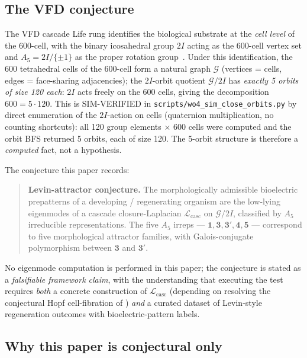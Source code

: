 \documentclass[12pt]{article}
\newcommand{\Lcasc}{\mathcal{L}_{\mathrm{casc}}}
\begin{document}
\subsection{The VFD conjecture}

The VFD cascade Life rung identifies the biological substrate at
the \emph{cell level} of the 600-cell, with the binary
icosahedral group $2I$ acting as the 600-cell vertex set and
$A_5 = 2I/\{\pm 1\}$ as the proper rotation
group~\cite[\S 2.1--2.3, \S 3.1]{CascadeBio}. Under this
identification, the 600 tetrahedral cells of the 600-cell form a
natural graph $\mathcal{G}$ (vertices = cells, edges =
face-sharing adjacencies); the $2I$-orbit quotient
$\mathcal{G}/2I$ has \emph{exactly 5 orbits of size 120 each}:
$2I$ acts freely on the 600 cells, giving the decomposition
$600 = 5 \cdot 120$. This is SIM-VERIFIED in
\texttt{scripts/wo4\_sim\_close\_orbits.py} by direct enumeration
of the $2I$-action on cells (quaternion multiplication, no
counting shortcuts): all 120 group elements × 600 cells were
computed and the orbit BFS returned 5 orbits, each of size 120.
The 5-orbit structure is therefore a \emph{computed} fact, not
a hypothesis.

The conjecture this paper records:

\begin{quote}
\textbf{Levin-attractor conjecture.} The morphologically
admissible bioelectric prepatterns of a developing / regenerating
organism are the low-lying eigenmodes of a cascade
closure-Laplacian $\Lcasc$ on $\mathcal{G}/2I$, classified by
$A_5$ irreducible representations. The five $A_5$ irreps ---
$\mathbf{1}, \mathbf{3}, \mathbf{3}', \mathbf{4}, \mathbf{5}$ ---
correspond to five morphological attractor families, with
Galois-conjugate polymorphism between $\mathbf{3}$ and
$\mathbf{3}'$.
\end{quote}

No eigenmode computation is performed in this paper; the
conjecture is stated as a \emph{falsifiable framework claim},
with the understanding that executing the test requires
\emph{both} a concrete construction of $\Lcasc$ (depending on
resolving the conjectural Hopf cell-fibration of
\cite[\S 2.6, \S 3.2]{CascadeBio}) \emph{and} a curated dataset
of Levin-style regeneration outcomes with bioelectric-pattern
labels.

\subsection{Why this paper is conjectural only}
\end{document}
